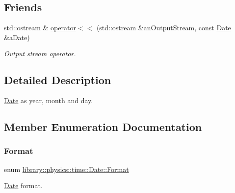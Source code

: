 \subsection*{Friends}
\begin{DoxyCompactItemize}
\item 
std\+::ostream \& \hyperlink{classlibrary_1_1physics_1_1time_1_1_date_a70ae98f5f6c575ec0c9bd948d12dea41}{operator$<$$<$} (std\+::ostream \&an\+Output\+Stream, const \hyperlink{classlibrary_1_1physics_1_1time_1_1_date}{Date} \&a\+Date)
\begin{DoxyCompactList}\small\item\em Output stream operator. \end{DoxyCompactList}\end{DoxyCompactItemize}


\subsection{Detailed Description}
\hyperlink{classlibrary_1_1physics_1_1time_1_1_date}{Date} as year, month and day. 

\subsection{Member Enumeration Documentation}
\mbox{\label{classlibrary_1_1physics_1_1time_1_1_date_a97671e22ec7b7825cf99ead6d86d0bf7}} 
\subsubsection{\texorpdfstring{Format}{Format}}
{\footnotesize\ttfamily enum \hyperlink{classlibrary_1_1physics_1_1time_1_1_date_a97671e22ec7b7825cf99ead6d86d0bf7}{library\+::physics\+::time\+::\+Date\+::\+Format}\hspace{0.3cm}{\ttfamily [strong]}}



\hyperlink{classlibrary_1_1physics_1_1time_1_1_date}{Date} format. 


